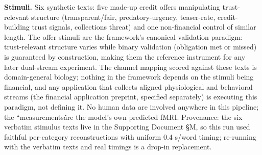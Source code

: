 \documentclass[11pt,twocolumn]{article}
\theoremstyle{plain}
\begin{document}
\textbf{Stimuli.} Six synthetic texts: five made-up credit offers manipulating trust-relevant structure (transparent/fair, predatory-urgency, teaser-rate, credit-building trust signals, collections threat) and one non-financial control of similar length. The offer stimuli are the framework's canonical validation paradigm: trust-relevant structure varies while binary validation (obligation met or missed) is guaranteed by construction, making them the reference instrument for any later dual-stream experiment. The channel mapping scored against these texts is domain-general biology; nothing in the framework depends on the stimuli being financial, and any application that collects aligned physiological and behavioral streams (the financial application preprint, specified separately) is executing this paradigm, not defining it. No human data are involved anywhere in this pipeline; the ``measurements\'\' are the model's own predicted fMRI. Provenance: the six verbatim stimulus texts live in the Supporting Document \S{}M, so this run used faithful per-category reconstructions with uniform 0.4 s/word timing; re-running with the verbatim texts and real timings is a drop-in replacement.
\end{document}
